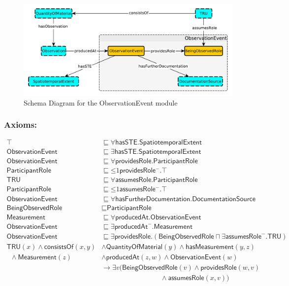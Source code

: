 \begin{figure}[tb]
\begin{center}
\includegraphics[width=.8\textwidth]{diagrams/observation_event}
\end{center}
\caption{Schema Diagram for the ObservationEvent module}
\label{fig:ObservationEvent}
\end{figure}

\subsubsection*{Axioms:}
\begin{align}
    \top &\sqsubseteq \forall\textsf{hasSTE.SpatiotemporalExtent}\\
    \textsf{ObservationEvent} &\sqsubseteq \exists\textsf{hasSTE.SpatiotemporalExtent}\\
    \textsf{ObservationEvent} &\sqsubseteq \forall\textsf{providesRole.ParticipantRole}\\
    \textsf{ParticipantRole} &\sqsubseteq \mathord{\leq} 1 \textsf{providesRole}\mathord{^-}.\top\\
    \textsf{TRU} &\sqsubseteq \forall\textsf{assumesRole.ParticipantRole}\\
    \textsf{ParticipantRole} &\sqsubseteq \mathord{\leq} 1 \textsf{assumesRole}\mathord{^-}.\top\\
    \textsf{ObservationEvent} &\sqsubseteq \forall\textsf{hasFurtherDocumentation.DocumentationSource} \\
    \textsf{BeingObservedRole} &\sqsubseteq \textsf{ParticipantRole}\\
    \textsf{Measurement} &\sqsubseteq \forall\textsf{producedAt.ObservationEvent}\\
    \textsf{ObservationEvent} &\sqsubseteq \exists\textsf{producedAt}^-.\textsf{Measurement}\\
    \textsf{ObservationEvent} &\sqsubseteq \exists\textsf{providesRole}.(\textsf{BeingObservedRole} \sqcap \exists \textsf{assumesRole}^-.\textsf{TRU})\\
    \textsf{TRU}(x) \wedge \textsf{consistsOf}(x,y) &\wedge \textsf{QuantityOfMaterial}(y) \wedge \textsf{hasMeasurement}(y,z)\nonumber\\ \phantom{k} \wedge \textsf{Measurement}(z) &\wedge \textsf{producedAt}(z,w) \wedge \textsf{ObservationEvent}(w)\nonumber\\ &\to \exists v (\textsf{BeingObservedRole}(v) \wedge \textsf{providesRole}(w,v)\nonumber\\ &\phantom{\wedge} \phantom{xxxxxxxxxxxxx} \wedge \textsf{assumesRole}(x,v))
\end{align}

